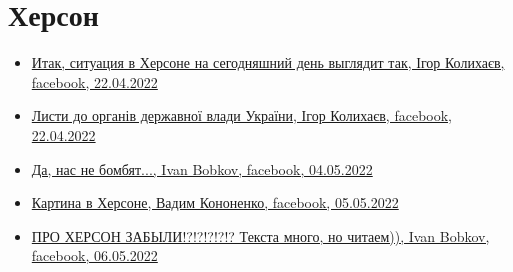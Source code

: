  
 
 
 
 

\section{Херсон}
\label{sec:topics.vojna.cities.herson}

\begin{itemize} %

\item \hyperlink{22_04_2022.fb.kolyhaev_igor.herson.mer.1.herson}{%
Итак, ситуация в Херсоне на сегодняшний день выглядит так, Ігор Колихаєв, facebook, 22.04.2022%
}

\item \hyperlink{26_04_2022.fb.kolyhaev_igor.herson.mer.1.lysty}{%
Листи до органів державної влади України, Ігор Колихаєв, facebook, 22.04.2022%
}

\item \hyperlink{04_05_2022.fb.bobkov_ivan.1.nas_ne_bombjat}{%
Да, нас не бомбят..., Ivan Bobkov, facebook, 04.05.2022%
}

\item \hyperlink{05_05_2022.fb.kononenko_vadim.herson.1.kartina_v_hersone}{%
Картина в Херсоне, Вадим Кононенко, facebook, 05.05.2022%
}

\item \hyperlink{06_05_2022.fb.bobkov_ivan.1.pro_herson_zabyli}{%
ПРО ХЕРСОН ЗАБЫЛИ!?!?!?!?!?  Текста много, но читаем)), Ivan Bobkov, facebook, 06.05.2022%
}

\end{itemize} %
